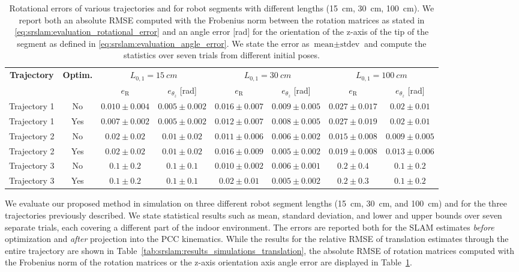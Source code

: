 \begin{table}\scriptsize
\centering
\caption{Rotational errors of various trajectories and for robot segments with different lengths (\SI{15}{cm}, \SI{30}{cm}, \SI{100}{cm}). We report both an absolute \gls{RMSE} computed with the Frobenius norm between the rotation matrices as stated in \eqref{eq:srslam:evaluation_rotational_error} and an angle error [rad] for the orientation of the z-axis of the tip of the segment as defined in \eqref{eq:srslam:evaluation_angle_error}. We state the error as $\text{mean} \pm \text{stdev}$ and compute the statistics over seven trials from different initial poses.}
\begin{tabular}{cc cc cc cc}
\toprule
    \multirow{2}{*}{\textbf{Trajectory}} & \multirow{2}{*}{\textbf{Optim.}} & \multicolumn{2}{c}{$L_{0,1} = \SI{15}{cm}$} & \multicolumn{2}{c}{$L_{0,1} = \SI{30}{cm}$} & \multicolumn{2}{c}{$L_{0,1} = \SI{100}{cm}$}\\
    & & $e_\mathrm{R}$ & $e_{\theta_z}$ [rad] & $e_\mathrm{R}$ & $e_{\theta_z}$ [rad] & $e_\mathrm{R}$ & $e_{\theta_z}$ [rad]\\
\midrule
    Trajectory 1 & No & $0.010 \pm 0.004$ & $0.005 \pm 0.002$ & $0.016 \pm 0.007$ & $0.009 \pm 0.005$ & $0.027 \pm 0.017$ & $0.02 \pm 0.01$ \\
    Trajectory 1 & Yes & $0.007 \pm 0.002$ & $0.005 \pm 0.002$ & $0.012 \pm 0.007$ & $0.008 \pm 0.005$ & $0.027 \pm 0.019$ & $0.02 \pm 0.01$ \\
    \midrule
    Trajectory 2 & No & $0.02 \pm 0.02$ & $0.01 \pm 0.02$ & $0.011 \pm 0.006$ & $0.006 \pm 0.002$ & $0.015 \pm 0.008$ &  $0.009 \pm 0.005$ \\
    Trajectory 2 & Yes & $0.02 \pm 0.02$ & $0.01 \pm 0.02$ & $0.016 \pm 0.009$ & $0.005 \pm 0.002$ & $0.019 \pm 0.008$ & $0.013 \pm 0.006$\\
    \midrule
    Trajectory 3 & No & $0.1 \pm 0.2$ &  $0.1 \pm 0.1$ & $0.010 \pm 0.002$ & $0.006 \pm 0.001$ & $0.2 \pm 0.4$ & $0.1 \pm 0.2$\\
    Trajectory 3 & Yes & $0.1 \pm 0.2$ & $0.1 \pm 0.1$ & $0.02 \pm 0.01$ & $0.005 \pm 0.002$ & $0.2 \pm 0.3$ & $0.1 \pm 0.2$\\
\bottomrule
\end{tabular}
\label{tab:srslam:results_simulations_rotation}
\end{table}

We evaluate our proposed method in simulation on three different robot segment lengths (\SI{15}{cm}, \SI{30}{cm}, and \SI{100}{cm}) and for the three trajectories previously described. 
We state statistical results such as mean, standard deviation, and lower and upper bounds over seven separate trials, each covering a different part of the indoor environment. 
The errors are reported both for the \gls{SLAM} estimates \emph{before} optimization and \emph{after} projection into the \gls{PCC} kinematics.
While the results for the relative \gls{RMSE} of translation estimates through the entire trajectory are shown in Table~\ref{tab:srslam:results_simulations_translation}, the absolute \gls{RMSE} of rotation matrices computed with the Frobenius norm of the rotation matrices or the z-axis orientation axis angle error are displayed in Table~\ref{tab:srslam:results_simulations_rotation}.

